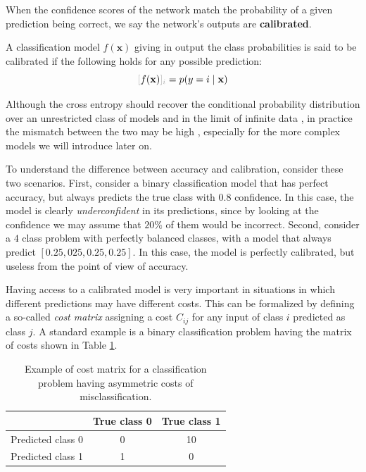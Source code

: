 When the confidence scores of the network match the probability of a given prediction being correct, we say the network’s outputs are \textbf{calibrated}.

\begin{definition}[Calibration]
A classification model $f(\mathbf{x})$ giving in output the class probabilities is said to be calibrated if the following holds for any possible prediction:
%
$$
\idx{f(\mathbf{x})}{i} = p(y=i \;\vert\; \mathbf{x})
$$
%
\end{definition}

Although the cross entropy should recover the conditional probability distribution over an unrestricted class of models and in the limit of infinite data \cite{hastie2009elements}, in practice the mismatch between the two may be high \cite{blasiok2024does}, especially for the more complex models we will introduce later on.

To understand the difference between accuracy and calibration, consider these two scenarios. First, consider a binary classification model that has perfect accuracy, but always predicts the true class with $0.8$ confidence. In this case, the model is clearly \textit{underconfident} in its predictions, since by looking at the confidence we may assume that $20\%$ of them would be incorrect. Second, consider a $4$ class problem with perfectly balanced classes, with a model that always predict $[0.25, 025, 0.25, 0.25]$. In this case, the model is perfectly calibrated, but useless from the point of view of accuracy.

Having access to a calibrated model is very important in situations in which different predictions may have different costs. This can be formalized by defining a so-called \textit{cost matrix} assigning a cost $C_{ij}$ for any input of class $i$ predicted as class $j$. A standard example is a binary classification problem having the matrix of costs shown in Table \ref{tab:cost_matrix}.

%
\begin{table}[h]
\centering
\caption{Example of cost matrix for a classification problem having asymmetric costs of misclassification.}
\label{tab:cost_matrix}
\begin{tabular}{@{}lcc@{}}
\toprule
 & True class 0 & True class 1 \\ \midrule
Predicted class 0 & 0 & 10 \\
Predicted class 1 & 1 & 0 \\ \bottomrule
\end{tabular}
\end{table}

